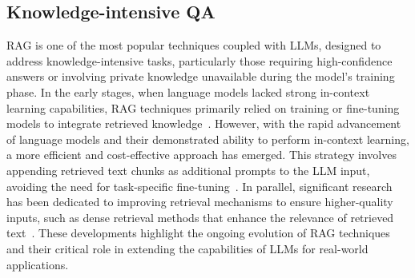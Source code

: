 \subsection{Knowledge-intensive QA}
RAG is one of the most popular techniques coupled with LLMs, designed to address knowledge-intensive tasks, particularly those requiring high-confidence answers or involving private knowledge unavailable during the model's training phase. 
In the early stages, when language models lacked strong in-context learning capabilities, RAG techniques primarily relied on training or fine-tuning models to integrate retrieved knowledge~\cite{izacard2020leveraging, borgeaud2022improving}. 
However, with the rapid advancement of language models and their demonstrated ability to perform in-context learning, a more efficient and cost-effective approach has emerged. 
This strategy involves appending retrieved text chunks as additional prompts to the LLM input, avoiding the need for task-specific fine-tuning~\cite{ram2023context}. 
In parallel, significant research has been dedicated to improving retrieval mechanisms to ensure higher-quality inputs, such as dense retrieval methods that enhance the relevance of retrieved text~\cite{karpukhin2020dense}. 
These developments highlight the ongoing evolution of RAG techniques and their critical role in extending the capabilities of LLMs for real-world applications.
